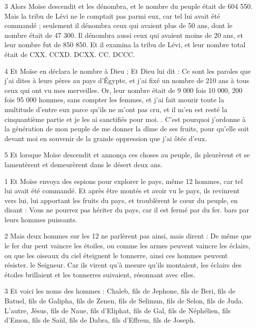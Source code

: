 \par 3 Alors Moïse descendit et les dénombra, et le nombre du peuple était de 604 550. Mais la tribu de Lévi ne le comptait pas parmi eux, car tel lui avait été commandé ; seulement il dénombra ceux qui avaient plus de 50 ans, dont le nombre était de 47 300. Il dénombra aussi ceux qui avaient moins de 20 ans, et leur nombre fut de 850 850. Et il examina la tribu de Lévi, et leur nombre total était de CXX. CCXD. DCXX. CC. DCCC.

\par 4 Et Moïse en déclara le nombre à Dieu ; Et Dieu lui dit : Ce sont les paroles que j'ai dites à leurs pères au pays d'Égypte, et j'ai fixé un nombre de 210 ans à tous ceux qui ont vu mes merveilles. Or, leur nombre était de 9 000 fois 10 000, 200 fois 95 000 hommes, sans compter les femmes, et j'ai fait mourir toute la multitude d'entre eux parce qu'ils ne m'ont pas cru, et il m'en est resté la cinquantième partie et je les ai sanctifiés pour moi. . C'est pourquoi j'ordonne à la génération de mon peuple de me donner la dîme de ses fruits, pour qu'elle soit devant moi en souvenir de la grande oppression que j'ai ôtée d'eux.

\par 5 Et lorsque Moïse descendit et annonça ces choses au peuple, ils pleurèrent et se lamentèrent et demeurèrent dans le désert deux ans.


\par 1 Et Moïse envoya des espions pour explorer le pays, même 12 hommes, car tel lui avait été commandé. Et après être montés et avoir vu le pays, ils revinrent vers lui, lui apportant les fruits du pays, et troublèrent le cœur du peuple, en disant : Vous ne pourrez pas hériter du pays, car il est fermé par du fer. bars par leurs hommes puissants.

\par 2 Mais deux hommes sur les 12 ne parlèrent pas ainsi, mais dirent : De même que le fer dur peut vaincre les étoiles, ou comme les armes peuvent vaincre les éclairs, ou que les oiseaux du ciel éteignent le tonnerre, ainsi ces hommes peuvent résister. le Seigneur. Car ils virent qu'à mesure qu'ils montaient, les éclairs des étoiles brillaient et les tonnerres suivaient, résonnant avec elles.

\par 3 Et voici les noms des hommes : Chaleb, fils de Jephone, fils de Beri, fils de Batuel, fils de Galipha, fils de Zenen, fils de Selimun, fils de Selon, fils de Juda. L'autre, Jésus, fils de Naue, fils d'Eliphat, fils de Gal, fils de Néphélien, fils d'Emon, fils de Saül, fils de Dabra, fils d'Effrem, fils de Joseph.


